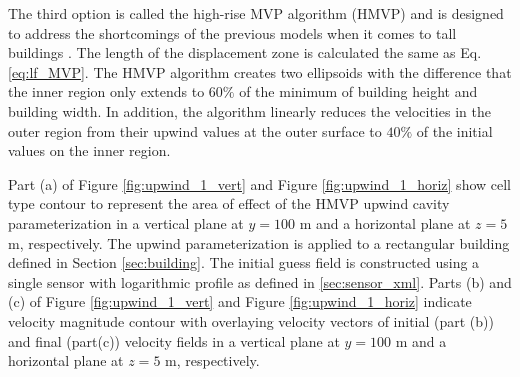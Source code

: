 The third option is called the high-rise MVP algorithm (HMVP) and is designed to address the shortcomings of the previous models when it comes to tall buildings  \cite{nelson20085}. The length of the displacement zone is calculated the same as Eq. \ref{eq:lf_MVP}. The HMVP algorithm creates two ellipsoids with the difference that the inner region only extends to $60\%$ of the minimum of building height and building width. In addition, the algorithm linearly reduces the velocities in the outer region from their upwind values at the outer surface to $40\%$ of the initial values on the inner region.

Part (a) of Figure \ref{fig:upwind_1_vert} and Figure \ref{fig:upwind_1_horiz} show cell type contour to represent the area of effect of the HMVP upwind cavity parameterization in a vertical plane at $y=100$ m and a horizontal plane at $z=5$ m, respectively. The upwind parameterization is applied to a rectangular building defined in Section \ref{sec:building}. The initial guess field is constructed using a single sensor with logarithmic profile as defined in \ref{sec:sensor_xml}. Parts (b) and (c) of Figure \ref{fig:upwind_1_vert} and Figure \ref{fig:upwind_1_horiz} indicate velocity magnitude contour with overlaying velocity vectors of initial (part (b)) and final (part(c)) velocity fields in a vertical plane at $y=100$ m and a horizontal plane at $z=5$ m, respectively.

